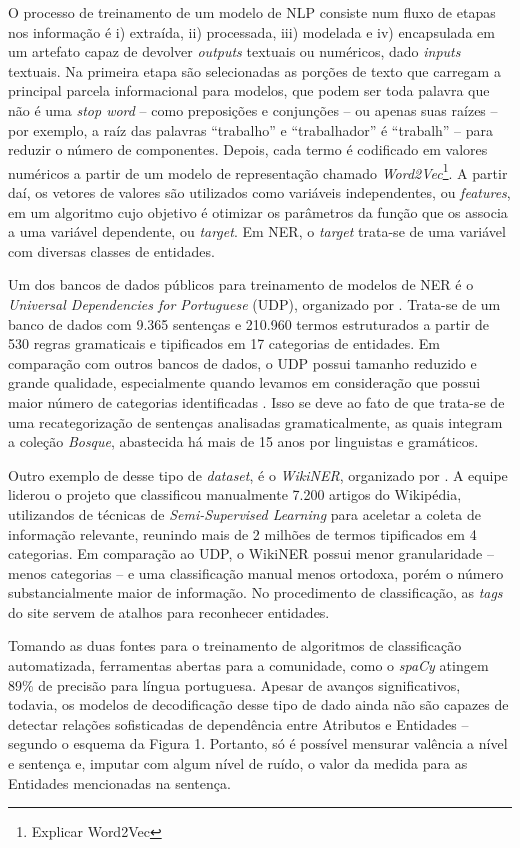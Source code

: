 \documentclass[
12pt,				%
openright,			%
twoside,			%
a4paper,			%
english,			%
french,				%
spanish,			%
brazil				%
]{abntex2}
\begin{document}
O processo de treinamento de um modelo de NLP consiste num fluxo de etapas nos informação é i) extraída, ii) processada, iii) modelada e iv) encapsulada em um artefato capaz de devolver \emph{outputs} textuais ou numéricos, dado \emph{inputs} textuais. Na primeira etapa são selecionadas as porções de texto que carregam a principal parcela informacional para modelos, que podem ser toda palavra que não é uma \emph{stop word} -- como preposições e conjunções -- ou apenas suas raízes -- por exemplo, a raíz das palavras ``trabalho'' e ``trabalhador'' é ``trabalh'' -- para reduzir o número de componentes. Depois, cada termo é codificado em valores numéricos a partir de um modelo de representação chamado \emph{Word2Vec}\footnote{Explicar Word2Vec}. A partir daí, os vetores de valores são utilizados como variáveis independentes, ou \emph{features}, em um algoritmo cujo objetivo é otimizar os parâmetros da função que os associa a uma variável dependente, ou \emph{target}. Em NER, o \emph{target} trata-se de uma variável com diversas classes de entidades. 

Um dos bancos de dados públicos para treinamento de modelos de NER é o \emph{Universal Dependencies for Portuguese} (UDP), organizado por . Trata-se de um banco de dados com 9.365 sentenças e 210.960 termos estruturados a partir de 530 regras gramaticais e tipificados em 17 categorias de entidades. Em comparação com outros bancos de dados, o UDP possui tamanho reduzido e grande qualidade, especialmente quando levamos em consideração que possui maior número de categorias identificadas \cite{sekine2004named}. Isso se deve ao fato de que trata-se de uma recategorização de sentenças analisadas gramaticalmente, as quais integram a coleção \emph{Bosque}, abastecida há mais de 15 anos por linguistas e gramáticos.  

Outro exemplo de desse tipo de \emph{dataset}, é o \emph{WikiNER}, organizado por . A equipe liderou o projeto que classificou manualmente 7.200 artigos do Wikipédia, utilizandos de técnicas de \emph{Semi-Supervised Learning} para aceletar a coleta de informação relevante, reunindo mais de 2 milhões de termos tipificados em 4 categorias. Em comparação ao UDP, o WikiNER possui menor granularidade -- menos categorias -- e uma classificação manual menos ortodoxa, porém o número substancialmente maior de informação. No procedimento de classificação, as \emph{tags} do site servem de atalhos para reconhecer entidades. 

Tomando as duas fontes para o treinamento de algoritmos de classificação automatizada, ferramentas abertas para a comunidade, como o \emph{spaCy} atingem 89{\%} de precisão para língua portuguesa. Apesar de avanços significativos, todavia, os modelos de decodificação desse tipo de dado ainda não são capazes de detectar relações sofisticadas de dependência entre Atributos e Entidades -- segundo o esquema da Figura 1. Portanto, só é possível mensurar valência a nível e sentença e, imputar com algum nível de ruído, o valor da medida para as Entidades mencionadas na sentença.
\end{document}
